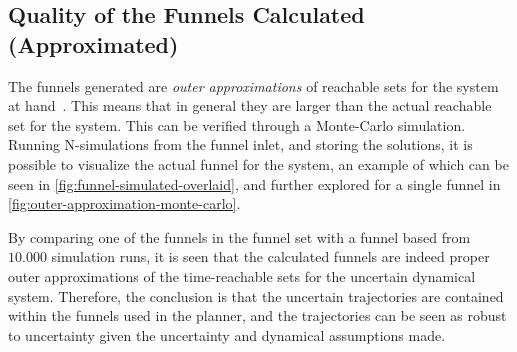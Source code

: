 \subsection{Quality of the Funnels Calculated (Approximated)}

The funnels generated are \textit{outer approximations} of reachable sets for
the system at hand~\cite{majumdarFunnelLibrariesRealtime2017}. This means that
in general they are larger than the actual reachable set for the system. This
can be verified through a Monte-Carlo simulation. Running N-simulations from the
funnel inlet, and storing the solutions, it is possible to visualize the actual
funnel for the system, an example of which can be seen in
\cref{fig:funnel-simulated-overlaid}, and further explored for a single funnel
in \cref{fig:outer-approximation-monte-carlo}.

By comparing one of the funnels in the funnel set with a funnel based from
\(10.000\) simulation runs, it is seen that the calculated funnels are indeed
proper outer approximations of the time-reachable sets for the uncertain
dynamical system. Therefore, the conclusion is that the uncertain trajectories
are contained within the funnels used in the planner, and the trajectories can
be seen as robust to uncertainty given the uncertainty and dynamical assumptions
made.

